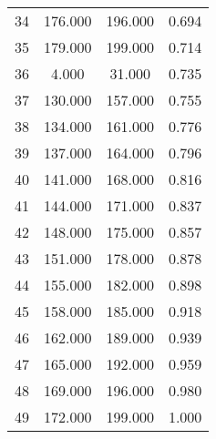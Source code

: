 \begin{tabular}{cccc}
  34 & 176.000 & 196.000 & 0.694 \\ 
  35 & 179.000 & 199.000 & 0.714 \\ 
  36 & 4.000 & 31.000 & 0.735 \\ 
  37 & 130.000 & 157.000 & 0.755 \\ 
  38 & 134.000 & 161.000 & 0.776 \\ 
  39 & 137.000 & 164.000 & 0.796 \\ 
  40 & 141.000 & 168.000 & 0.816 \\ 
  41 & 144.000 & 171.000 & 0.837 \\ 
  42 & 148.000 & 175.000 & 0.857 \\ 
  43 & 151.000 & 178.000 & 0.878 \\ 
  44 & 155.000 & 182.000 & 0.898 \\ 
  45 & 158.000 & 185.000 & 0.918 \\ 
  46 & 162.000 & 189.000 & 0.939 \\ 
  47 & 165.000 & 192.000 & 0.959 \\ 
  48 & 169.000 & 196.000 & 0.980 \\ 
  49 & 172.000 & 199.000 & 1.000 \\ 
   \hline
\end{tabular}
